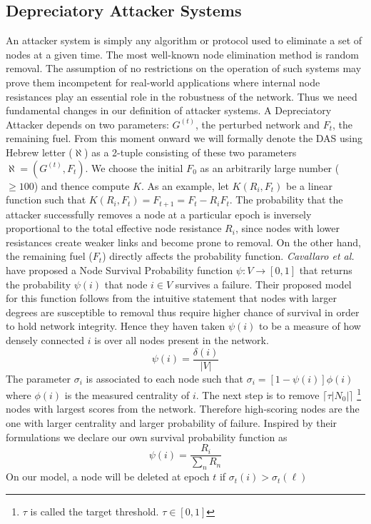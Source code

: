 \documentclass{article}
\begin{document}
	\subsection{Depreciatory Attacker Systems}
	An attacker system is simply any algorithm or protocol used to eliminate a set of nodes at a given time. The most well-known node elimination method is random removal. The assumption of no restrictions on the operation of such systems may prove them incompetent for real-world applications where internal node resistances play an essential role in the robustness of the network. Thus we need fundamental changes in our definition of attacker systems. A Depreciatory Attacker depends on two parameters: $G^{(t)}$, the perturbed network and $F_{t}$, the remaining fuel. From this moment onward we will formally denote the DAS using Hebrew letter ($\aleph$) as a 2-tuple consisting of these two parameters 
	$\aleph =(G^{(t)},F_t)$. We choose the initial $F_0$ as an arbitrarily large number ($ \geq 100$) and thence compute $K$. As an example, let $K(R_i,F_{t})$ be a linear function such that $K(R_i,F_{t})= F_{t+1} = F_{t} - R_i F_{t}$. 
	The probability that the attacker successfully removes a node at a particular epoch is inversely proportional to the total effective node resistance $R_i$, since nodes with lower resistances create weaker links and become prone to removal. On the other hand, the remaining fuel ($F_{t}$) directly affects the probability function.
	\textit{Cavallaro et al.}\cite{ProbabNodeFailure} have proposed a Node Survival Probability function $\psi:V\rightarrow [0,1]$ that returns the probability $\psi(i)$ that node $i\in V$ survives a failure. Their proposed model for this function follows from the intuitive statement that nodes with larger degrees are susceptible to removal thus require higher chance of survival in order to hold network integrity. Hence they haven taken $\psi(i)$ to be a measure of how densely connected $i$ is over all nodes present in the network.
	\begin{equation*}
		\psi(i) = \frac{\delta(i)}{|V|}
	\end{equation*}
	The parameter $\sigma_i$ is associated to each node such that $\sigma_i = [1-\psi(i)]\phi(i)$ where $\phi(i)$ is the measured centrality of $i$. The next step is to remove $\lceil \tau|N_0| \rceil$ \footnote{$\tau$ is called the target threshold. $\tau \in [0,1]$} nodes with largest scores from the network. Therefore high-scoring nodes are the one with larger centrality and larger probability of failure. Inspired by their formulations we declare our own survival probability function as
	\begin{equation}
		\psi(i) = \frac{R_i}{\sum_{n} R_n}
	\end{equation}
	On our model, a node will be deleted at epoch $t$ if $\sigma_t(i) > \sigma_t(\ell)$
	\pagebreak
	
	
\end{document}

